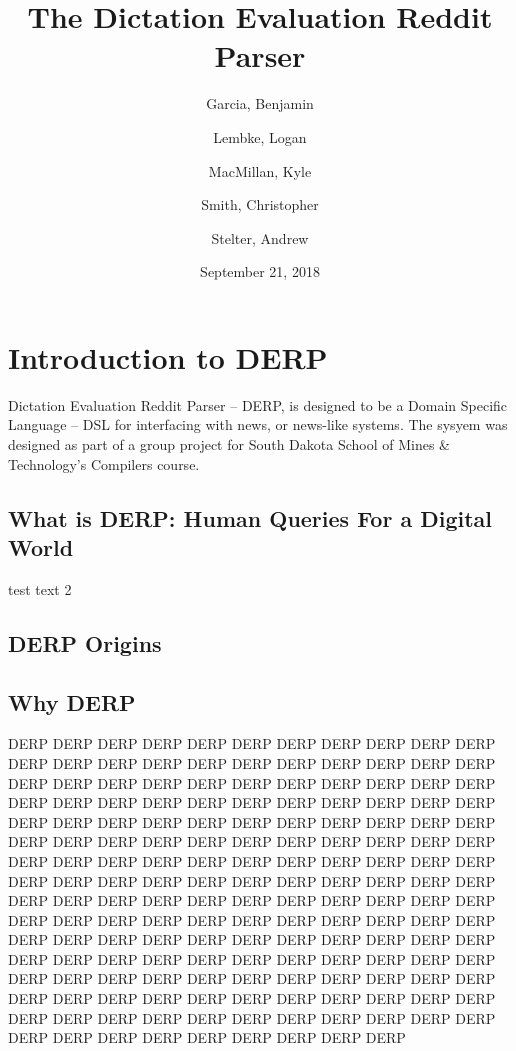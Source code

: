 \documentclass{article}
\title{The Dictation Evaluation Reddit Parser}
\author{
Garcia, Benjamin \and
Lembke, Logan \and 
MacMillan, Kyle  \and 
Smith, Christopher \and 
Stelter, Andrew 
}
\date{September 21, 2018}
\begin{document}
\maketitle

\newpage
\tableofcontents

\newpage


\section{Introduction to DERP}
\setcounter{page}{1} %
Dictation Evaluation Reddit Parser -- DERP, is designed to be a Domain Specific Language -- DSL for interfacing with news, or news-like systems. The sysyem was designed as part of a group project for South Dakota School of Mines \& Technology's Compilers course.

\newpage

\subsection{What is DERP: Human Queries For a Digital World}
test text 2
\subsection{DERP Origins}
\subsection{Why DERP}
DERP DERP DERP DERP DERP DERP DERP DERP DERP DERP DERP DERP DERP DERP DERP DERP DERP DERP DERP DERP DERP DERP DERP DERP DERP DERP DERP DERP DERP DERP DERP DERP DERP DERP DERP DERP DERP DERP DERP DERP DERP DERP DERP DERP DERP DERP DERP DERP DERP DERP DERP DERP DERP DERP DERP DERP DERP DERP DERP DERP DERP DERP DERP DERP DERP DERP DERP DERP DERP DERP DERP DERP DERP DERP DERP DERP DERP DERP DERP DERP DERP DERP DERP DERP DERP DERP DERP DERP DERP DERP DERP DERP DERP DERP DERP DERP DERP DERP DERP DERP DERP DERP DERP DERP DERP DERP DERP DERP DERP DERP DERP DERP DERP DERP DERP DERP DERP DERP DERP DERP DERP DERP DERP DERP DERP DERP DERP DERP DERP DERP DERP DERP DERP DERP DERP DERP DERP DERP DERP DERP DERP DERP DERP DERP DERP DERP DERP DERP DERP DERP DERP DERP DERP DERP DERP DERP DERP DERP DERP DERP DERP DERP DERP DERP DERP DERP DERP DERP DERP DERP DERP DERP DERP DERP 
\end{document}
